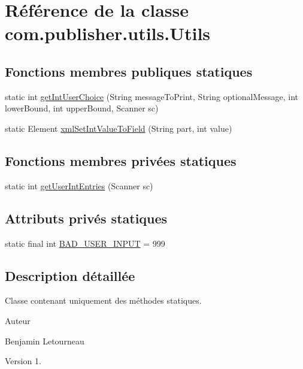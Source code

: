\hypertarget{classcom_1_1publisher_1_1utils_1_1Utils}{\section{Référence de la classe com.\-publisher.\-utils.\-Utils}
\label{classcom_1_1publisher_1_1utils_1_1Utils}
}
\subsection*{Fonctions membres publiques statiques}
\begin{DoxyCompactItemize}
\item 
static int \hyperlink{classcom_1_1publisher_1_1utils_1_1Utils_afd3e752b26b6bd265fa6317a22a285c1}{get\-Int\-User\-Choice} (String message\-To\-Print, String optional\-Message, int lower\-Bound, int upper\-Bound, Scanner sc)
\item 
static Element \hyperlink{classcom_1_1publisher_1_1utils_1_1Utils_a48c46510d34ef280dc7702e747247621}{xml\-Set\-Int\-Value\-To\-Field} (String part, int value)
\end{DoxyCompactItemize}
\subsection*{Fonctions membres privées statiques}
\begin{DoxyCompactItemize}
\item 
static int \hyperlink{classcom_1_1publisher_1_1utils_1_1Utils_a6694d513fd607577d3146a91c7c45338}{get\-User\-Int\-Entries} (Scanner sc)
\end{DoxyCompactItemize}
\subsection*{Attributs privés statiques}
\begin{DoxyCompactItemize}
\item 
static final int \hyperlink{classcom_1_1publisher_1_1utils_1_1Utils_a9fea6ecddb80eabef5ae8976e8f65d81}{B\-A\-D\-\_\-\-U\-S\-E\-R\-\_\-\-I\-N\-P\-U\-T} = 999
\end{DoxyCompactItemize}


\subsection{Description détaillée}
Classe contenant uniquement des méthodes statiques. \begin{DoxyAuthor}{Auteur}

\begin{DoxyItemize}
\item Benjamin Letourneau 
\end{DoxyItemize}
\end{DoxyAuthor}
\begin{DoxyVersion}{Version}
1. 
\end{DoxyVersion}


